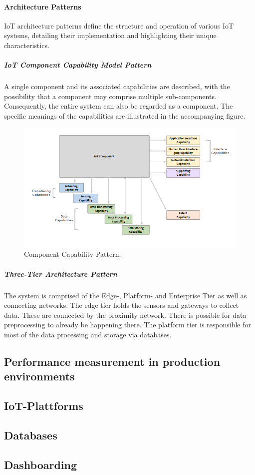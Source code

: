 \paragraph{Architecture Patterns}
IoT architecture patterns define the structure and operation of various IoT systems, detailing their implementation and highlighting their unique characteristics.
\subparagraph{IoT Component Capability Model Pattern}
A single component and its associated capabilities are described, with the possibility that a component may comprise multiple sub-components. Consequently, the entire system can also be regarded as a component. The specific meanings of the capabilities are illustrated in the accompanying figure.
\begin{figure}
	\includegraphics[width=\linewidth]{images/IIRA-model-component-pattern.png}
	\caption{Component Capability Pattern.}
	\label{fig:boat1}
\end{figure}
\subparagraph{Three-Tier Architecture Pattern}
The system is comprised of the Edge-, Platform- and Enterprise Tier as well as connecting networks. The edge tier holds the sensors and gateways to collect data. These are connected by the proximity network. There is possible for data preprocessing to already be happening there.
The platform tier is responsible for most of the data processing and storage via databases.
\subsection{Performance measurement in production environments}
\subsection{IoT-Plattforms}
\subsection{Databases}
\subsection{Dashboarding}
